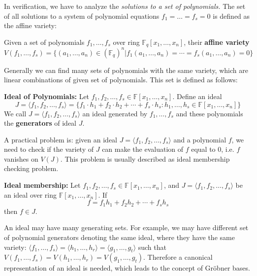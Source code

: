 In verification, we have to analyze the {\it solutions to a
set of polynomials.} The set of all solutions to a system of
polynomial equations $f_1 = \dots = f_s = 0$ is defined as the affine variety:
\begin{definition}
Given a set of polynomials $f_1,\dots,f_s$ over ring $\mathbb F_q[x_1,\dots,x_n]$, their 
{\bf affine variety} 
$$V(f_1,\dots,f_s) = \{(a_1,\dots,a_n)\in  (\mathbb F_q)^n |
f_1(a_1,\dots,a_n) = \cdots = f_s(a_1,\dots,a_n) = 0\}$$ 
\end{definition}

Generally we can find many sets of polynomials with the same variety, which are linear combinations
of given set of polynomials. This set is defined as follows:
\begin{definition}
{\bf Ideal of Polynomials:} Let $f_1,f_2,\dots,f_s\in \mathbb F[x_1,\dots,x_n]$.
Define an ideal
$$J = \langle f_1,f_2,\dots,f_s\rangle = \{f_1\cdot h_1 + f_2\cdot h_2 +\cdots + f_s\cdot h_s : h_1,\dots,h_s\in \mathbb F[x_1,\dots,x_n]\}$$
We call $J = \langle f_1,f_2,\dots,f_s\rangle$ an ideal generated by $f_1,\dots,f_s$ and these polynomials 
the {\bf generators} of ideal $J$.
\end{definition}
A practical problem is: given an ideal $J = \langle f_1,f_2,\dots,f_s\rangle$ and a polynomial $f$,
we need to check if the variety of $J$ can make the evaluation of $f$ equal to 0, i.e. $f$ vanishes on $V(J)$.
This problem is usually described as ideal membership checking problem.
\begin{definition}
{\bf Ideal membership:} Let $f_1,f_2,\dots,f_s\in \mathbb F[x_1,\dots,x_n]$, and $J = \langle f_1,f_2,\dots,f_s\rangle$
be an ideal over ring $\mathbb F[x_1,\dots,x_n]$. If 
$$f = f_1h_1 + f_2h_2 + \cdots + f_sh_s$$
then $f\in J$.
\end{definition}

An ideal may have many generating sets. For example, we may have different set of polynomial generators denoting
the same ideal, where they have the same variety: $\langle f_1,\dots,f_s\rangle = \langle h_1,\dots,h_r\rangle
= \langle g_1,\dots,g_t\rangle$ such that $V(f_1,\dots,f_s) = V(h_1,\dots,h_r) = V(g_1,\dots,g_t)$.
Therefore a canonical representation of an ideal is needed, which leads to the concept of Gr\"obner bases.

